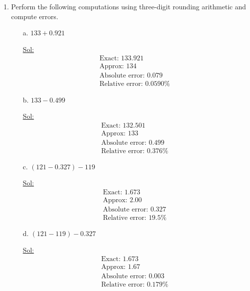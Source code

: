 \begin{enumerate}
\item Perform the following computations using three-digit rounding
  arithmetic and compute errors.
  \begin{itemize}
    \item[a.] \( 133 + 0.921 \)

      \underline{Sol:}\\
      \[
        \begin{array}{l}
          \textrm{Exact: } 133.921 \\
          \textrm{Approx: } 134 \\
          \textrm{Absolute error: } 0.079 \\
          \textrm{Relative error: } 0.0590\%
        \end{array}
      \]
      \bigbreak

    \item[b.] \( 133 - 0.499 \)

      \underline{Sol:}\\
      \[
        \begin{array}{l}
          \textrm{Exact: } 132.501 \\
          \textrm{Approx: } 133 \\
          \textrm{Absolute error: } 0.499 \\
          \textrm{Relative error: } 0.376\%
        \end{array}
      \]
      \bigbreak

    \item[c.] \( (121 - 0.327) - 119 \)

      \underline{Sol:}\\
      \[
        \begin{array}{l}
          \textrm{Exact: } 1.673 \\
          \textrm{Approx: } 2.00 \\
          \textrm{Absolute error: } 0.327 \\
          \textrm{Relative error: } 19.5\%
        \end{array}
      \]
      \bigbreak

    \item[d.] \( (121 - 119) - 0.327 \)

      \underline{Sol:}\\
      \[
        \begin{array}{l}
          \textrm{Exact: } 1.673 \\
          \textrm{Approx: } 1.67 \\
          \textrm{Absolute error: } 0.003 \\
          \textrm{Relative error: } 0.179\%
        \end{array}
      \]
      \bigbreak


\end{itemize}
\end{enumerate}
